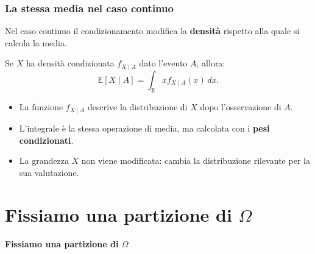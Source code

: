 \documentclass[handout]{beamer}%
\newenvironment{stepitemize}{\begin{itemize}[<+->]}{\end{itemize} }
\providecommand{\R}{\mathbb{R}}
\providecommand{\E}{\mathbb{E}}
\providecommand{\1}{\mathbf{1}}
\providecommand{\QTR}[2]{\csname #1\endcsname{#2}}
\begin{document}
\begin{frame}%
%

\frametitle{La stessa media nel caso continuo}%
%

%


Nel caso continuo il condizionamento modifica la \textbf{densit\`{a}} rispetto
alla quale si calcola la media.

\medskip

Se $X$ ha densit\`{a} condizionata $f_{X\mid A}$ dato l'evento $A$, allora:
\[
\E[X\mid A] = \int_{\R} x f_{X\mid A}(x)\,dx.
\]


\medskip

\begin{stepitemize}
\item La funzione $f_{X\mid A}$ descrive la distribuzione di $X$ dopo
l'osservazione di $A$.

\item L'integrale \`{e} la stessa operazione di media, ma calcolata con i
\textbf{pesi condizionati}.

\item La grandezza $X$ non viene modificata: cambia la distribuzione rilevante
per la sua valutazione.
\end{stepitemize}%

\transboxout
\end{frame}%




\section{Fissiamo una partizione di \texorpdfstring{$\Omega$}{Omega}}%

\begin{frame}%



\vfill


\begin{center}
\textcolor{light-blue}{{\Large \textbf{Fissiamo una partizione di $\Omega$}}}
\end{center}

\vfill
%

\transboxout
\end{frame}%
\end{document}
